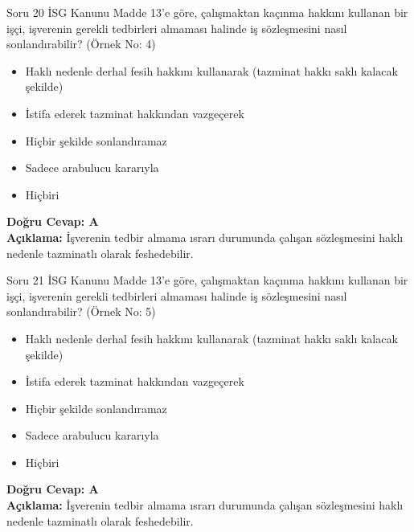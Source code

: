 \documentclass[12pt,a4paper]{article}
\begin{document}
\begin{testcard}{Soru 20}
    İSG Kanunu Madde 13'e göre, çalışmaktan kaçınma hakkını kullanan bir işçi, işverenin gerekli tedbirleri almaması halinde iş sözleşmesini nasıl sonlandırabilir? (Örnek No: 4)
    \begin{itemize}
        \item[A)] Haklı nedenle derhal fesih hakkını kullanarak (tazminat hakkı saklı kalacak şekilde)
        \item[B)] İstifa ederek tazminat hakkından vazgeçerek
        \item[C)] Hiçbir şekilde sonlandıramaz
        \item[D)] Sadece arabulucu kararıyla
        \item[E)] Hiçbiri
    \end{itemize}
    \tcblower
    \textbf{Doğru Cevap: A} \\
    \textbf{Açıklama:} İşverenin tedbir almama ısrarı durumunda çalışan sözleşmesini haklı nedenle tazminatlı olarak feshedebilir.
\end{testcard}

\begin{testcard}{Soru 21}
    İSG Kanunu Madde 13'e göre, çalışmaktan kaçınma hakkını kullanan bir işçi, işverenin gerekli tedbirleri almaması halinde iş sözleşmesini nasıl sonlandırabilir? (Örnek No: 5)
    \begin{itemize}
        \item[A)] Haklı nedenle derhal fesih hakkını kullanarak (tazminat hakkı saklı kalacak şekilde)
        \item[B)] İstifa ederek tazminat hakkından vazgeçerek
        \item[C)] Hiçbir şekilde sonlandıramaz
        \item[D)] Sadece arabulucu kararıyla
        \item[E)] Hiçbiri
    \end{itemize}
    \tcblower
    \textbf{Doğru Cevap: A} \\
    \textbf{Açıklama:} İşverenin tedbir almama ısrarı durumunda çalışan sözleşmesini haklı nedenle tazminatlı olarak feshedebilir.
\end{testcard}
\end{document}
